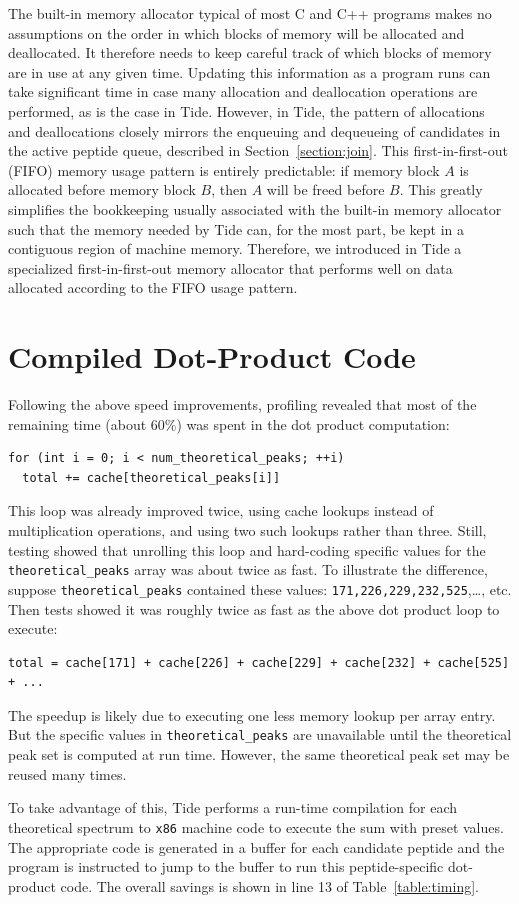 The built-in memory allocator typical of most C and C++ programs makes
no assumptions on the order in which blocks of memory will be
allocated and deallocated. It therefore needs to keep careful track of
which blocks of memory are in use at any given time. Updating this
information as a program runs can take significant time in case many
allocation and deallocation operations are performed, as is the case
in Tide. However, in Tide, the pattern of allocations and
deallocations closely mirrors the enqueuing and dequeueing of
candidates in the active peptide queue, described in
Section~\ref{section:join}. This first-in-first-out (FIFO)
memory usage pattern is entirely predictable: if memory block $A$ is
allocated before memory block $B$, then $A$ will be freed before
$B$. This greatly simplifies the bookkeeping usually associated with
the built-in memory allocator such that the memory needed by Tide can,
for the most part, be kept in a contiguous region of machine
memory. Therefore, we introduced in Tide a specialized
first-in-first-out memory allocator that performs well on data
allocated according to the FIFO usage pattern.

\section{Compiled Dot-Product Code \label{section:compiler}}

Following the above speed improvements, profiling revealed that most
of the remaining time (about $60\%$) was spent in the dot product
computation:
\begin{verbatim}
for (int i = 0; i < num_theoretical_peaks; ++i)
  total += cache[theoretical_peaks[i]]
\end{verbatim}

This loop was already improved twice, using cache lookups instead of
multiplication operations, and using two such lookups rather than
three. Still, testing showed that unrolling this loop and hard-coding
specific values for the {\tt theoretical\_peaks} array was about twice
as fast. To illustrate the difference, suppose
{\tt theoretical\_peaks} contained these values:
{\tt 171,226,229,232,525},\ldots, etc.
Then tests showed it was roughly twice as fast as the above dot
product loop to execute:
\begin{verbatim}
total = cache[171] + cache[226] + cache[229] + cache[232] + cache[525] + ...
\end{verbatim}
The speedup is likely due to executing one less memory lookup per
array entry. But the specific values in {\tt theoretical\_peaks} are
unavailable until the theoretical peak set is computed at run
time. However, the same theoretical peak set may be reused many times.

To take advantage of this, Tide performs a run-time compilation for
each theoretical spectrum to {\tt x86} machine code to execute the
sum with preset values. The appropriate code is generated in a buffer
for each candidate peptide and the program is instructed to jump to
the buffer to run this peptide-specific dot-product code. The overall
savings is shown in line 13 of Table~\ref{table:timing}.
